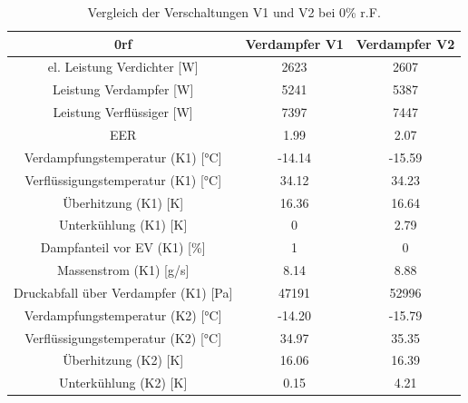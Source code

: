 \begin{table}[h!]
\centering
\caption{Vergleich der Verschaltungen V1 und V2 bei 0\% r.F.}
\label{tab:VergleichV1V2_0rF}
\begin{tabular}{|ccc|}
\hline

0rf                                                             & Verdampfer V1               & Verdampfer V2 \\ \hline
\multicolumn{1}{|c|}{el. Leistung Verdichter {[}W{]}}           & \multicolumn{1}{c|}{2623}   & 2607          \\
\multicolumn{1}{|c|}{Leistung Verdampfer {[}W{]}}               & \multicolumn{1}{c|}{5241}   & 5387          \\
\multicolumn{1}{|c|}{Leistung Verflüssiger {[}W{]}}             & \multicolumn{1}{c|}{7397}   & 7447          \\
\multicolumn{1}{|c|}{EER}                                       & \multicolumn{1}{c|}{1.99}   & 2.07          \\ \hline
\multicolumn{1}{|c|}{Verdampfungstemperatur (K1) {[}°C{]}}      & \multicolumn{1}{c|}{-14.14} & -15.59        \\
\multicolumn{1}{|c|}{Verflüssigungstemperatur (K1) {[}°C{]}}    & \multicolumn{1}{c|}{34.12}  & 34.23         \\
\multicolumn{1}{|c|}{Überhitzung (K1) {[}K{]}}                  & \multicolumn{1}{c|}{16.36}  & 16.64         \\
\multicolumn{1}{|c|}{Unterkühlung (K1) {[}K{]}}                 & \multicolumn{1}{c|}{0}      & 2.79          \\
\multicolumn{1}{|c|}{Dampfanteil vor EV (K1) {[}\%{]}}          & \multicolumn{1}{c|}{1}      & 0             \\
\multicolumn{1}{|c|}{Massenstrom (K1) {[}g/s{]}}                & \multicolumn{1}{c|}{8.14}   & 8.88          \\
\multicolumn{1}{|c|}{Druckabfall über Verdampfer (K1) {[}Pa{]}} & \multicolumn{1}{c|}{47191}  & 52996         \\ \hline
\multicolumn{1}{|c|}{Verdampfungstemperatur (K2) {[}°C{]}}      & \multicolumn{1}{c|}{-14.20} & -15.79        \\
\multicolumn{1}{|c|}{Verflüssigungstemperatur (K2) {[}°C{]}}    & \multicolumn{1}{c|}{34.97}  & 35.35         \\
\multicolumn{1}{|c|}{Überhitzung (K2) {[}K{]}}                  & \multicolumn{1}{c|}{16.06}  & 16.39         \\
\multicolumn{1}{|c|}{Unterkühlung (K2) {[}K{]}}                 & \multicolumn{1}{c|}{0.15}   & 4.21          \\

\end{tabular}
\end{table}
